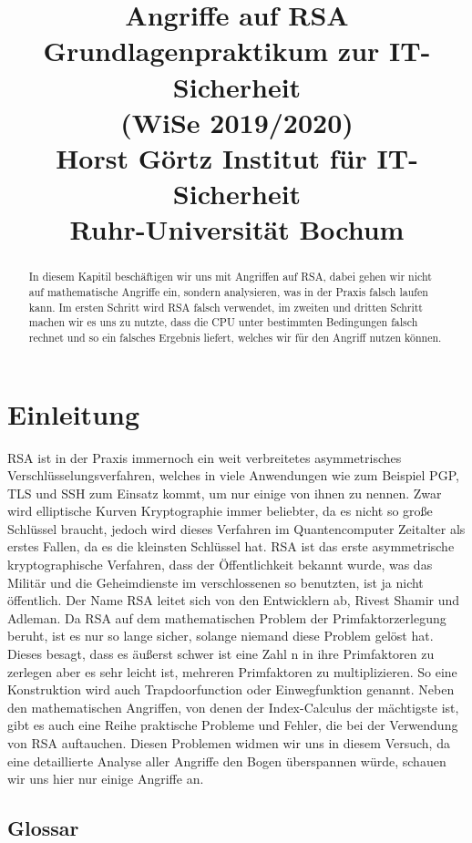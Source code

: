 \documentclass{article}
\title{
Angriffe auf RSA\\\vspace{7mm}
Grundlagenpraktikum zur IT-Sicherheit\\(WiSe 2019/2020)\\\vspace{1cm}
\large{Horst Görtz Institut für IT-Sicherheit\\
Ruhr-Universität Bochum
\\\vspace{1cm}}}
\begin{document}
\maketitle
\thispagestyle{empty}

\begin{abstract}
\noindent
In diesem Kapitil beschäftigen wir uns mit Angriffen auf RSA, dabei gehen wir nicht auf mathematische Angriffe ein, sondern analysieren, was in der Praxis falsch laufen kann. Im ersten Schritt wird RSA falsch verwendet, im zweiten und dritten Schritt machen wir es uns zu nutzte, dass die CPU unter bestimmten Bedingungen falsch rechnet und so ein falsches Ergebnis liefert, welches wir für den Angriff nutzen können.
\end{abstract}
\newpage
\thispagestyle{empty}
\tableofcontents

\newpage
\setlength{\parindent}{0pt}
\setcounter{page}{1}
\section{Einleitung}
RSA ist in der Praxis immernoch ein weit verbreitetes asymmetrisches Verschlüsselungsverfahren, welches in viele Anwendungen wie zum Beispiel PGP, TLS und SSH zum Einsatz kommt, um nur einige von ihnen zu nennen. Zwar wird elliptische Kurven Kryptographie immer beliebter, da es nicht so große Schlüssel braucht, jedoch wird dieses Verfahren im Quantencomputer Zeitalter als erstes Fallen, da es die kleinsten Schlüssel hat. RSA ist das erste asymmetrische kryptographische Verfahren, dass der Öffentlichkeit bekannt wurde, was das Militär und die Geheimdienste im verschlossenen so benutzten, ist ja nicht öffentlich. Der Name RSA leitet sich von den Entwicklern ab, Rivest Shamir und Adleman. Da RSA auf dem mathematischen Problem der Primfaktorzerlegung beruht, ist es nur so lange sicher, solange niemand diese Problem gelöst hat. Dieses besagt, dass es äußerst schwer ist eine Zahl n in ihre Primfaktoren zu zerlegen aber es sehr leicht ist, mehreren Primfaktoren zu multiplizieren. So eine Konstruktion wird auch Trapdoorfunction oder Einwegfunktion genannt. Neben den mathematischen Angriffen, von denen der Index-Calculus der mächtigste ist, gibt es auch eine Reihe praktische Probleme und Fehler, die bei der Verwendung von RSA auftauchen. Diesen Problemen widmen wir uns in diesem Versuch, da eine detaillierte Analyse aller Angriffe den Bogen überspannen würde, schauen wir uns hier nur einige Angriffe an.
\subsection{Glossar}
\newpage %
\end{document}
